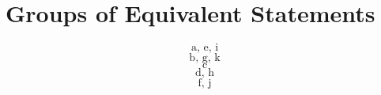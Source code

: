 \section{Groups of Equivalent Statements}

\[
\text{a, e, i}
\]
\[
\text{b, g, k}
\]
\[
\text{c}
\]
\[
\text{d, h}
\]
\[
\text{f, j}
\]
